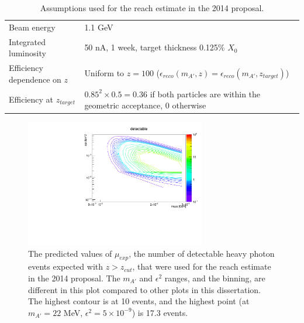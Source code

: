 \begin{table}[ht]
    \begin{center}
        \caption{Assumptions used for the reach estimate in the 2014 proposal.}
        \begin{tabular}{lp{}}
            \hline \hline
            Beam energy & 1.1 GeV \\
            Integrated luminosity & 50 nA, 1 week, target thickness 0.125\% $X_0$ \\
            Efficiency dependence on $z$ & Uniform to $z=100$ ($\epsilon_{reco}(m_{A'},z) = \epsilon_{reco}(m_{A'},z_{target})$) \\
            Efficiency at $z_{target}$ & $0.85^2\times 0.5=0.36$ if both particles are within the geometric acceptance, 0 otherwise \\
            \hline \hline
        \end{tabular}
        \label{tab:proposal_assumptions} 
    \end{center}
\end{table}

\begin{figure}[ht]
\begin{center}
    \includegraphics[width=0.7\textwidth,page=1,angle=-90]{vertexing/figs/mgraham_signal}
\end{center}
    \caption{The predicted values of $\mu_{exp}$, the number of detectable heavy photon events expected with $z>z_{cut}$, that were used for the reach estimate in the 2014 proposal.
    The $m_{A'}$ and $\epsilon^2$ ranges, and the binning, are different in this plot compared to other plots in this dissertation.
    The highest contour is at 10 events, and the highest point (at $m_{A'}=22$ MeV, $\epsilon^2=5\times 10^{-9}$) is 17.3 events.
    }
    \label{fig:proposal_detectable}
\end{figure}

